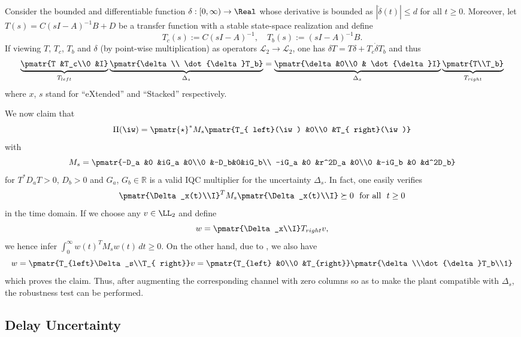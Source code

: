 \begin{lem}\label{lem:swap}
Consider the bounded and differentiable function $\delta:[0,\infty)\to\Real$ whose derivative is bounded as $|\dot{\delta}(t)| \leq d$ for all $t\geq 0$. Moreover, let $T(s) = C(sI-A)^{-1}B+D$ be a transfer function with a stable state-space realization and define
\[
T_c(s) :=  C(sI-A)^{-1}, \quad T_b(s) :=  (sI-A)^{-1}B.
\]
If viewing $T$, $T_c$, $T_b$ and $\delta$ (by point-wise multiplication) as operators
$\mathcal{L}_2\to \mathcal{L}_2$, one has $\delta T = T\delta  + T_c \dot{\delta} T_b $ and thus
\[
\underbrace{\pmatr{T &T_c\\0 &I}}_{T_{ left}}\underbrace{
\pmatr{\delta\\ \dot{\delta}T_b}}_{\Delta_s} = \underbrace{\pmatr{\delta &0\\0 & \dot{\delta}I}}_{\Delta_x} \underbrace{\pmatr{T\\T_b}}_{T_{ right}}
\]
where $x$, $s$ stand for ``eXtended'' and ``Stacked'' respectively.
\end{lem}
We now claim that
\[
\Pi(\iw) = \pmatr{\star}^*{M}_s\pmatr{T_{ left}(\iw) &0\\0 &T_{ right}(\iw)}
\]
with
\[
{M}_s = \pmatr{-D_a &0 &iG_a &0\\0 &-D_b&0&iG_b\\ -iG_a &0 &r^2D_a &0\\0 &-iG_b &0 &d^2D_b}
\]
for $T^*D_aT > 0$, $D_b>0$ and $G_a$, $G_b\in\mathbb{R}$ is a valid IQC multiplier for the uncertainty $\Delta_s$. In fact,
one easily verifies
\[
\pmatr{\Delta_x(t)\\I}^TM_s\pmatr{\Delta_x(t)\\I} \succeq 0
\text{\ \ for all\ \ }t\geq 0
\]
in the time domain. If we choose any $v\in \LL_2$ and define
$$w=\pmatr{\Delta_x\\I}T_{right}v,$$
we hence infer $\int_0^\infty w(t)^TM_sw(t)\,dt\geq 0$. On the other hand, due to , we also have
$$
w=\pmatr{T_{left}\Delta_s\\T_{ right}}v=\pmatr{T_{left} &0\\0 &T_{right}}
\pmatr{\delta \\\dot{\delta}T_b\\1}
$$
which proves the claim. Thus, after augmenting the corresponding channel with zero columns so as to make the plant compatible with $\Delta_s$, the robustness test can be performed.


\subsection{Delay Uncertainty}\label{sec:delayiqc}

